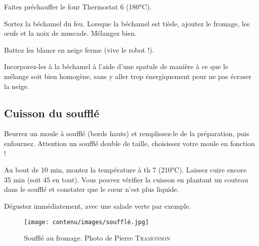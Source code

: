 \begin{instructions}

	\item Faites préchauffer le four Thermostat 6 (180°C).
	\item Sortez la béchamel du feu. Lorsque la béchamel est tiède, ajoutez le
	fromage, les œufs et la noix de muscade. Mélangez bien.
	\item Battez les blancs en neige ferme (vive le robot !).
	\item Incorporez-les à la béchamel à l’aide d’une spatule de manière à ce
	que le mélange soit bien homogène, sans y aller trop énergiquement pour
	ne pas écraser la neige.

\end{instructions}

\subsection*{Cuisson du soufflé}

\begin{instructions}

	\item Beurrez un moule à soufflé (bords hauts) et remplissez-le de la
	préparation, puis enfournez. Attention un soufflé double de taille,
	choisissez votre moule en fonction !
	\item  Au bout de 10 min, montez la température à th 7 (210°C). Laissez
	cuire encore 35 min (soit 45 en tout). Vous pouvez vérifier la cuisson en
	plantant un couteau dans le soufflé et constater que le cœur n’est plus
	liquide.
	\item Dégustez immédiatement, avec une salade verte par exemple.

\end{instructions}

\begin{figure}[h]
	\begin{center}
		\texttt{[image: contenu/images/soufflé.jpg]}
	\end{center}
	\caption{Soufflé au fromage. Photo de Pierre \textsc{Tramonson}}
	\label{fig:souffle}
\end{figure}